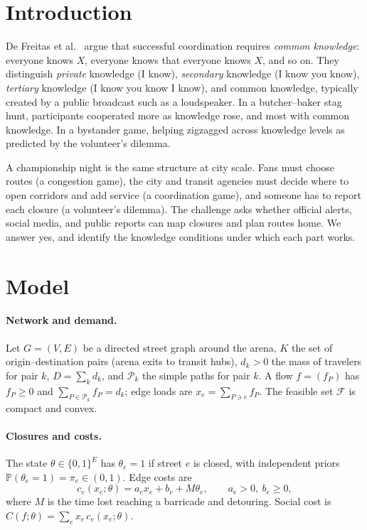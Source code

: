 \documentclass[11pt]{article}
\theoremstyle{definition}
\theoremstyle{remark}
\renewcommand{\Pr}{\mathbb{P}}
\newcommand{\1}{\mathbf{1}}
\begin{document}
\section{Introduction}

De Freitas et al.\ \cite{dfp} argue that successful coordination requires
\emph{common knowledge}: everyone knows $X$, everyone knows that everyone
knows $X$, and so on. They distinguish \emph{private} knowledge (I know),
\emph{secondary} knowledge (I know you know), \emph{tertiary} knowledge (I
know you know I know), and common knowledge, typically created by a public
broadcast such as a loudspeaker. In a butcher--baker stag hunt, participants
cooperated more as knowledge rose, and most with common knowledge. In a
bystander game, helping zigzagged across knowledge levels as predicted by
the volunteer's dilemma.

A championship night is the same structure at city scale. Fans must choose
routes (a congestion game), the city and transit agencies must decide where
to open corridors and add service (a coordination game), and someone has
to report each closure (a volunteer's dilemma). The challenge asks whether
official alerts, social media, and public reports can map closures and plan
routes home. We answer yes, and identify the knowledge conditions under
which each part works.

\section{Model}

\paragraph{Network and demand.}
Let $G=(V,E)$ be a directed street graph around the arena, $K$ the set of
origin--destination pairs (arena exits to transit hubs), $d_k>0$ the mass of
travelers for pair $k$, $D=\sum_kd_k$, and $\mathcal P_k$ the simple paths
for pair $k$. A flow $f=(f_P)$ has $f_P\ge0$ and
$\sum_{P\in\mathcal P_k}f_P=d_k$; edge loads are $x_e=\sum_{P\ni e}f_P$.
The feasible set $\mathcal F$ is compact and convex.

\paragraph{Closures and costs.}
The state $\theta\in\{0,1\}^E$ has $\theta_e=1$ if street $e$ is closed,
with independent priors $\Pr(\theta_e=1)=\pi_e\in(0,1)$. Edge costs are
\begin{equation}\label{eq:cost}
c_e(x_e;\theta)=a_ex_e+b_e+M\theta_e,\qquad a_e>0,\ b_e\ge0,
\end{equation}
where $M$ is the time lost reaching a barricade and detouring. Social cost
is $C(f;\theta)=\sum_ex_e\,c_e(x_e;\theta)$.
\end{document}
